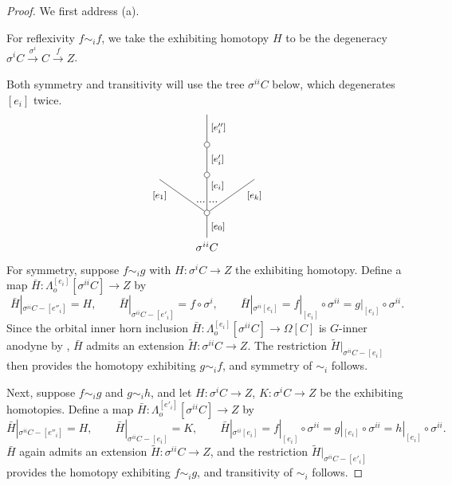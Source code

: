 \documentclass[a4paper,10pt]{article}%
\numberwithin{equation}{section}
\numberwithin{figure}{section}
\theoremstyle{definition} %
\newcommand{\1}{\ensuremath{\mathbbm 1}}%
\begin{document}
\begin{proof}
	We first address (a). 
	
	For reflexivity $f \sim_i f$,
	we take the exhibiting homotopy 
	$H$ to be the degeneracy
	$\sigma^i C \xrightarrow{\sigma^i} C \xrightarrow{f} Z$.
	
	Both symmetry and transitivity will use the 
	tree $\sigma^{ii} C$ below, which degenerates $[e_i]$ twice.
\[
\begin{tikzpicture}
[grow=up,auto,level distance=3em,
every node/.style = {font=\footnotesize},
dummy/.style={circle,draw,inner sep=0pt,minimum size=1.75mm}]
	\node at (0,0) [font=\normalsize]{$\sigma^{ii} C$}
		child{node [dummy] {}
			child{
			edge from parent node [swap,near end] {$[e_k]$} node [near start,inner sep=1pt,name=Kn] {}}
			child[level distance=3.4em]{node [dummy] {}
				child[level distance=2.7em]{node [dummy] {}
					child[level distance=2.7em]{
					edge from parent node [swap] {$[e''_i]$}
}
				edge from parent node [swap] {$[e'_i]$}
}
			edge from parent node [near end,swap] {$[e_i]$}
node [near start,inner sep=1pt,name=Kone,swap] {}
node [near start,inner sep=1pt,name=Kone1] {}}
			child{
			edge from parent node [near end] {$[e_1]$}
node [swap] {}
node [near start,inner sep=1pt,name=Kn1,swap]{}}
		edge from parent node [swap] {$[e_0]$}
		};
		\draw [dotted,thick] (Kone) -- (Kn) ;
		\draw [dotted,thick] (Kone1) -- (Kn1) ;
\end{tikzpicture}
\]
For symmetry, suppose $f \sim_i g$ with 
$H \colon \sigma^{i} C \to Z$ the exhibiting homotopy.
Define a map 
$\bar{H} \colon \Lambda^{[e_i]}_o[\sigma^{ii} C] \to Z$ by
\[
	\bar{H}|_{\sigma^{ii}C - [e''_i]} = H,
		\qquad
	\bar{H}|_{\sigma^{ii}C - [e'_i]} = f \circ \sigma^i,
		\qquad
	\bar{H}|_{\sigma^{ii} [e_i]} = 
	f|_{[e_i]} \circ \sigma^{ii} =
	g|_{[e_i]} \circ \sigma^{ii}.
\]
Since the orbital inner horn inclusion
$\bar{H} \colon \Lambda^{[e_i]}_o[\sigma^{ii} C] \to \Omega[C]$
is $G$-inner anodyne by \cite[Prop. 3.13]{BP_edss},
$\bar{H}$ admits an extension $\widetilde{H} \colon \sigma^{ii}C \to Z$.
The restriction $\widetilde{H}|_{\sigma^{ii}C - [e_i]}$ then provides the homotopy exhibiting $g \sim_i f$, and symmetry of $\sim_i$ follows.

Next, suppose $f \sim_i g$ and $g \sim_i h$, and let 
$H \colon \sigma^{i} C \to Z$,
$K \colon \sigma^{i} C \to Z$ be the exhibiting homotopies.
Define a map 
$\bar{H} \colon \Lambda^{[e'_i]}_o[\sigma^{ii} C] \to Z$ by
\[
	\bar{H}|_{\sigma^{ii}C - [e''_i]} = H,
		\qquad
	\bar{H}|_{\sigma^{ii}C - [e_i]} = K,
		\qquad
	\bar{H}|_{\sigma^{ii} [e_i]} = 
	f|_{[e_i]} \circ \sigma^{ii} =
	g|_{[e_i]} \circ \sigma^{ii} =
	h|_{[e_i]} \circ \sigma^{ii}.
\]
$\bar{H}$ again admits an extension $\widetilde{H} \colon \sigma^{ii}C \to Z$, 
and the restriction $\widetilde{H}|_{\sigma^{ii}C - [e'_i]}$
provides the homotopy exhibiting $f \sim_i g$, and transitivity of $\sim_i$ follows.



\end{proof}
\end{document}
